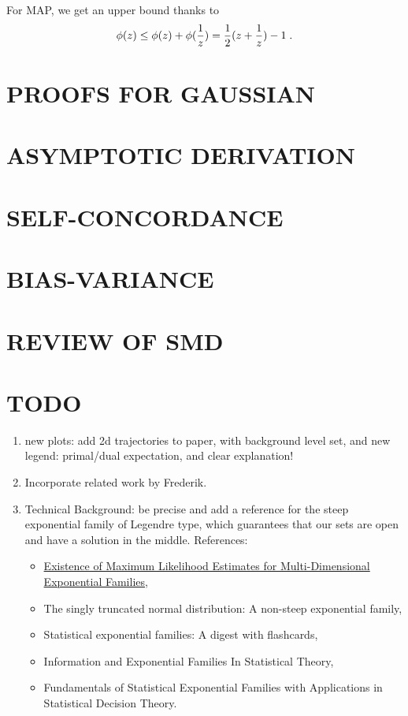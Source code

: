 \documentclass[twoside]{article}
\let\oldsection\section
\renewcommand{\section}[1]{\oldsection{\texorpdfstring{\uppercase{#1}}{#1}}}
\begin{document}
For MAP, we get an upper bound thanks to
\begin{align}
	\label{eq:log_bound}
	\phi(z) \leq \phi(z) + \phi(\frac{1}{z}) =  \frac{1}{2} (z + \frac{1}{z}) - 1 \; .
\end{align}

\section{PROOFS FOR GAUSSIAN}
\label{app:gaussian}

\section{ASYMPTOTIC DERIVATION}
\label{app:asymptote}

\section{SELF-CONCORDANCE}
\label{app:self-concordant}

\section{BIAS-VARIANCE}
\label{app:bias-variance}

\section{REVIEW OF SMD}
\label{app:SMD}

\section{TODO}
\begin{enumerate}
	\item new plots: add 2d trajectories to paper, with background level set, and new legend: primal/dual expectation, and clear explanation!
	\item Incorporate related work by Frederik.
	\item Technical Background: be precise and add a reference for the steep exponential family of Legendre type, which guarantees that our sets are open and have a solution in the middle.
	References: \begin{itemize}
		\item \href{https://www.jstor.org/stable/4616462?seq=1#metadata_info_tab_contents}{Existence of Maximum Likelihood Estimates for Multi-Dimensional Exponential Families},
		\item The singly truncated normal distribution: A non-steep exponential family,
		\item Statistical exponential families: A digest with flashcards,
		\item Information and Exponential Families In Statistical Theory,
		\item Fundamentals of Statistical Exponential Families with Applications in Statistical Decision Theory.
	\end{itemize}
\end{enumerate}
\end{document}
